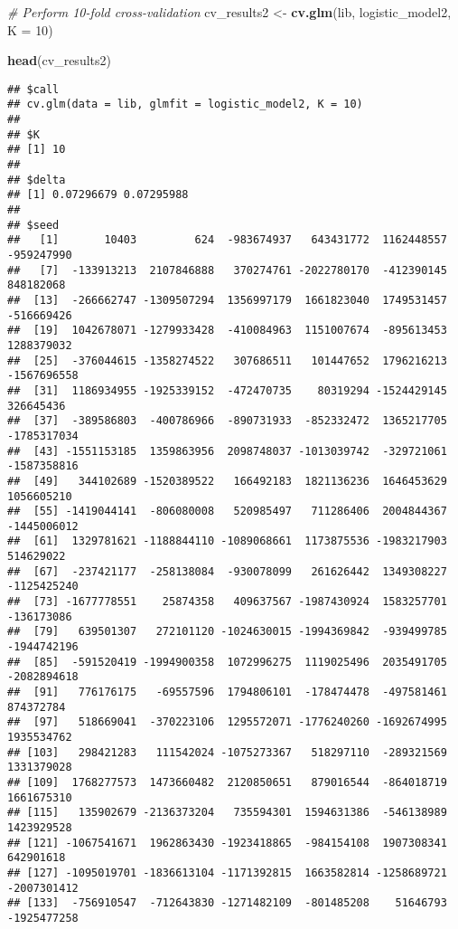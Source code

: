 \documentclass[
]{article}
\newenvironment{Shaded}{\begin{snugshade}}{\end{snugshade}}
\newcommand{\AttributeTok}[1]{\textcolor[rgb]{0.13,0.29,0.53}{#1}}
\newcommand{\CommentTok}[1]{\textcolor[rgb]{0.56,0.35,0.01}{\textit{#1}}}
\newcommand{\DecValTok}[1]{\textcolor[rgb]{0.00,0.00,0.81}{#1}}
\newcommand{\FunctionTok}[1]{\textcolor[rgb]{0.13,0.29,0.53}{\textbf{#1}}}
\newcommand{\NormalTok}[1]{#1}
\newcommand{\OtherTok}[1]{\textcolor[rgb]{0.56,0.35,0.01}{#1}}
\begin{document}
\begin{Shaded}
\begin{Highlighting}[]
\CommentTok{\# Perform 10{-}fold cross{-}validation}
\NormalTok{cv\_results2 }\OtherTok{\textless{}{-}} \FunctionTok{cv.glm}\NormalTok{(lib, logistic\_model2, }\AttributeTok{K =} \DecValTok{10}\NormalTok{)}

\FunctionTok{head}\NormalTok{(cv\_results2)}
\end{Highlighting}
\end{Shaded}

\begin{verbatim}
## $call
## cv.glm(data = lib, glmfit = logistic_model2, K = 10)
## 
## $K
## [1] 10
## 
## $delta
## [1] 0.07296679 0.07295988
## 
## $seed
##   [1]       10403         624  -983674937   643431772  1162448557  -959247990
##   [7]  -133913213  2107846888   370274761 -2022780170  -412390145   848182068
##  [13]  -266662747 -1309507294  1356997179  1661823040  1749531457  -516669426
##  [19]  1042678071 -1279933428  -410084963  1151007674  -895613453  1288379032
##  [25]  -376044615 -1358274522   307686511   101447652  1796216213 -1567696558
##  [31]  1186934955 -1925339152  -472470735    80319294 -1524429145   326645436
##  [37]  -389586803  -400786966  -890731933  -852332472  1365217705 -1785317034
##  [43] -1551153185  1359863956  2098748037 -1013039742  -329721061 -1587358816
##  [49]   344102689 -1520389522   166492183  1821136236  1646453629  1056605210
##  [55] -1419044141  -806080008   520985497   711286406  2004844367 -1445006012
##  [61]  1329781621 -1188844110 -1089068661  1173875536 -1983217903   514629022
##  [67]  -237421177  -258138084  -930078099   261626442  1349308227 -1125425240
##  [73] -1677778551    25874358   409637567 -1987430924  1583257701  -136173086
##  [79]   639501307   272101120 -1024630015 -1994369842  -939499785 -1944742196
##  [85]  -591520419 -1994900358  1072996275  1119025496  2035491705 -2082894618
##  [91]   776176175   -69557596  1794806101  -178474478  -497581461   874372784
##  [97]   518669041  -370223106  1295572071 -1776240260 -1692674995  1935534762
## [103]   298421283   111542024 -1075273367   518297110  -289321569  1331379028
## [109]  1768277573  1473660482  2120850651   879016544  -864018719  1661675310
## [115]   135902679 -2136373204   735594301  1594631386  -546138989  1423929528
## [121] -1067541671  1962863430 -1923418865  -984154108  1907308341   642901618
## [127] -1095019701 -1836613104 -1171392815  1663582814 -1258689721 -2007301412
## [133]  -756910547  -712643830 -1271482109  -801485208    51646793 -1925477258

\end{verbatim}
\end{document}
